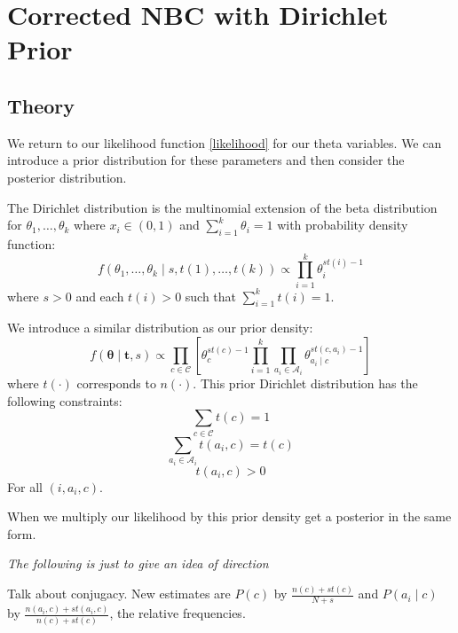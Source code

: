 \chapter{Corrected NBC with Dirichlet Prior}

\section{Theory}

We return to our likelihood function \cref{likelihood} for our theta variables.
We can introduce a prior distribution for these parameters and then consider the posterior distribution.

The Dirichlet distribution is the multinomial extension of the beta distribution for $\theta_1,\dots,\theta_k$ where $x_i \in (0,1)$ and $\sum_{i=1}^k \theta_i = 1$ with probability density function:
\begin{equation} \label{dirichlet_pdf}
	f(\theta_1,\dots,\theta_k \mid s, t(1),\dots,t(k)) \propto \prod_{i=1}^k \theta_i^{st(i) - 1}
\end{equation}
where $s > 0$ and each $t(i)>0$ such that $\sum_{i=1}^{k}t(i) = 1$.

We introduce a similar distribution as our prior density:
\begin{equation} \label{prior}
	f(\mathbf{\theta} \mid \mathbf{t}, s) \propto \prod_{c \in \mathcal{C}} \left[ \theta_c^{st(c) - 1} \prod_{i=1}^k \prod_{a_i \in \mathcal{A}_i} \theta_{a_i \mid c}^{st(c, a_i) - 1} \right]
\end{equation}
where $t(\cdot)$ corresponds to $n(\cdot)$.
This prior Dirichlet distribution \cite{Zaffalon01} has the following constraints:
\begin{equation}
	\sum_{c \in \mathcal{C}} t(c) = 1
\end{equation}
\begin{equation}
	\sum_{a_i \in \mathcal{A}_i} t(a_i, c) = t(c)
\end{equation}
\begin{equation}
	t(a_i, c) > 0
\end{equation}
For all $(i, a_i, c)$.

When we multiply our likelihood by this prior density get a posterior in the same form.

\textit{The following is just to give an idea of direction}

Talk about conjugacy.
New estimates are $P(c)$ by $\frac{n(c) + st(c)}{N + s}$ and $P(a_i \mid c)$ by $\frac{n(a_i, c) + st(a_i,c)}{n(c)+st(c)}$, the relative frequencies.

